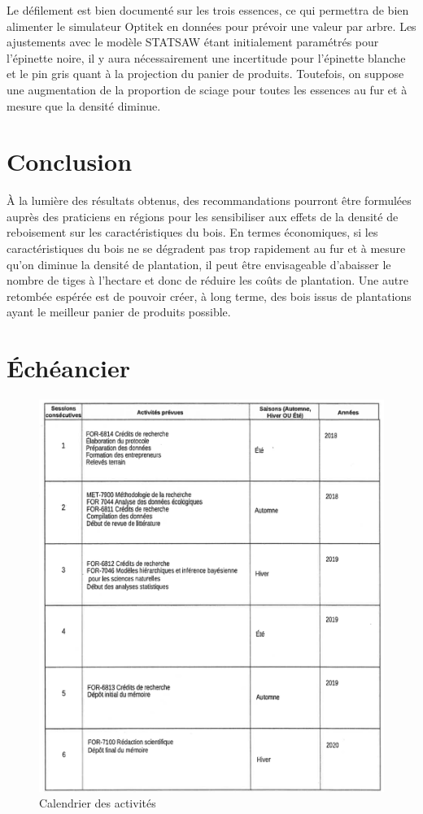 \documentclass[letterpaper, 12pt]{article}
\begin{document}
\begin{onehalfspace}
\vspace{12pt}

Le défilement est bien documenté sur les trois essences, ce qui permettra de bien alimenter le simulateur Optitek en données pour prévoir une valeur par arbre. Les ajustements avec le modèle STATSAW étant initialement paramétrés pour l'épinette noire, il y aura nécessairement une incertitude pour l'épinette blanche et le pin gris quant à la projection du panier de produits. Toutefois, on suppose une augmentation de la proportion de sciage pour toutes les essences au fur et à mesure que la densité diminue. 

\section{Conclusion}

À la lumière des résultats obtenus, des recommandations pourront être formulées auprès des praticiens en régions pour les sensibiliser aux effets de la densité de reboisement sur les caractéristiques du bois. En  termes  économiques,  si  les caractéristiques du bois ne se dégradent pas trop rapidement au fur et à mesure qu'on diminue la densité de plantation,  il peut être envisageable d'abaisser le nombre de tiges à l'hectare et donc de réduire les  coûts  de  plantation. Une autre retombée espérée est de pouvoir créer, à long terme, des bois issus de plantations ayant le meilleur panier de produits possible. 

\end{onehalfspace}

\section{Échéancier}

\begin{figure}[H]
	\centering
	\includegraphics[width=15cm]{Calendrier}
	\caption{Calendrier des activités}
\end{figure}

\newpage

\nocite{*}


\end{document}
